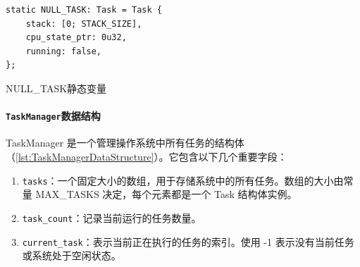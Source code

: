 \begin{listing}[htbp]
    \begin{verbatim}
static NULL_TASK: Task = Task {
    stack: [0; STACK_SIZE],
    cpu_state_ptr: 0u32,
    running: false,
};
    \end{verbatim}
    \caption{NULL\_TASK静态变量}\label{lst:NullTaskStaticVariable}
\end{listing}

\paragraph{\texttt{TaskManager}数据结构}

TaskManager 是一个管理操作系统中所有任务的结构体（\cref{lst:TaskManagerDataStructure}）。它包含以下几个重要字段：

\begin{enumerate}
    \item \texttt{tasks}：一个固定大小的数组，用于存储系统中的所有任务。数组的大小由常量 MAX\_TASKS 决定，每个元素都是一个 Task 结构体实例。
    \item \texttt{task\_count}：记录当前运行的任务数量。
    \item \texttt{current\_task}：表示当前正在执行的任务的索引。使用 -1 表示没有当前任务或系统处于空闲状态。
\end{enumerate}

